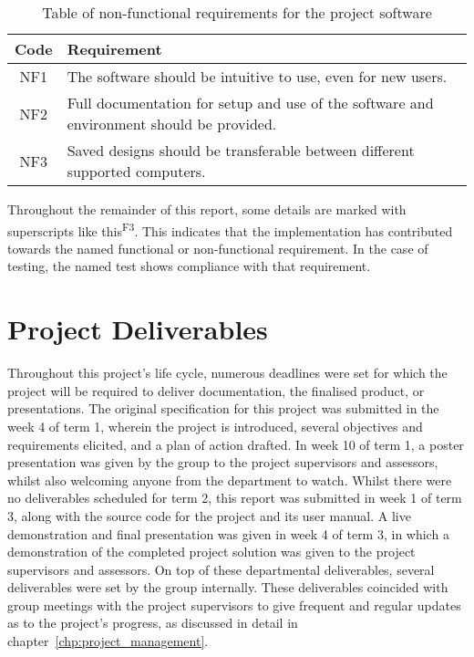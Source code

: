         \begin{center}
            \begin{longtable}{ | c | p{} | }
                \caption{Table of non-functional requirements for the project software}\label{tab:nonfun_requirements}\\%
                \hline Code & Requirement\\ \hline
                NF1 & The software should be intuitive to use, even for new users. \\  \hline
                NF2 & Full documentation for setup and use of the software and environment should be provided. \\\hline
                NF3 & Saved designs should be transferable between different supported computers. \\\hline
        \end{longtable}
    \end{center}
    
    Throughout the remainder of this report, some details are marked with superscripts like this\textsuperscript{F3}. This indicates that the implementation has contributed towards the named functional or non-functional requirement. In the case of testing, the named test shows compliance with that requirement.

\section{Project Deliverables}
    
    Throughout this project's life cycle, numerous deadlines were set for which the project will be required to deliver documentation, the finalised product, or presentations. The original specification for this project was submitted in the week 4 of term 1, wherein the project is introduced, several objectives and requirements elicited, and a plan of action drafted. In week 10 of term 1, a poster presentation was given by the group to the project supervisors and assessors, whilst also welcoming anyone from the department to watch. Whilst there were no deliverables scheduled for term 2, this report was submitted in week 1 of term 3, along with the source code for the project and its user manual. A live demonstration and final presentation was given in week 4 of term 3, in which a demonstration of the completed project solution was given to the project supervisors and assessors. On top of these departmental deliverables, several deliverables were set by the group internally. These deliverables coincided with group meetings with the project supervisors to give frequent and regular updates as to the project's progress, as discussed in detail in chapter~\ref{chp:project_management}.

